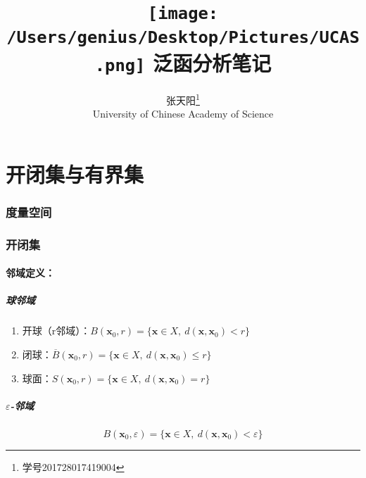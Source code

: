 \documentclass[11pt]{article}
\begin{document}
\begin{CJK*}{UTF8}{gbsn}

\begin{titlepage}
	
\title{\protect \texttt{[image: /Users/genius/Desktop/Pictures/UCAS.png]} \Huge \textbf{泛函分析笔记}}

\author{张天阳\thanks{学号201728017419004}\\
University of Chinese Academy of Science}
\maketitle
\end{titlepage}



\tableofcontents

\pagebreak

\part{开闭集与有界集}
\section{度量空间}

\section{开闭集}
\subsection{邻域定义：}
\subsubsection{球邻域}
\begin{enumerate}
	\item 开球（r邻域）：$B(\bm x_0,r)=\{\bm x \in X,~d(\bm x,\bm x_0)<r \}$
	\item 闭球：$\overline{B}(\bm x_0,r)=\{\bm x \in X,~d(\bm x,\bm x_0)\leq r \}$
	\item 球面：$S(\bm x_0,r)=\{\bm x \in X,~d(\bm x,\bm x_0)=r \}$
\end{enumerate}
\subsubsection{$\varepsilon$-邻域}
\begin{equation*}
	B(\bm x_0,\varepsilon )=\{\bm x \in X,~d(\bm x,\bm x_0)<\varepsilon \}
\end{equation*}

\end{CJK*}
\end{document}
